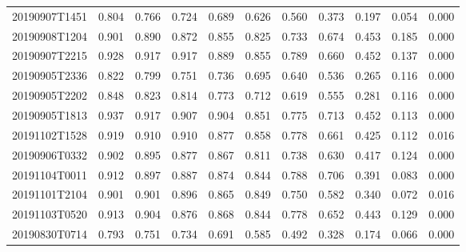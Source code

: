 \begin{table}[!ht]
{\begin{tabular}{ccccccccccc}
			20190907T1451 &          0.804 &          0.766 &          0.724 &          0.689 &          0.626 &          0.560 &          0.373 &          0.197 &          0.054 &          0.000 \\
			20190908T1204 &          0.901 &          0.890 &          0.872 &          0.855 &          0.825 &          0.733 &          0.674 &          0.453 &          0.185 &          0.000 \\
			20190907T2215 &          0.928 &          0.917 &          0.917 &          0.889 &          0.855 &          0.789 &          0.660 &          0.452 &          0.137 &          0.000 \\
			20190905T2336 &          0.822 &          0.799 &          0.751 &          0.736 &          0.695 &          0.640 &          0.536 &          0.265 &          0.116 &          0.000 \\
			20190905T2202 &          0.848 &          0.823 &          0.814 &          0.773 &          0.712 &          0.619 &          0.555 &          0.281 &          0.116 &          0.000 \\
			20190905T1813 &          0.937 &          0.917 &          0.907 &          0.904 &          0.851 &          0.775 &          0.713 &          0.452 &          0.113 &          0.000 \\
			20191102T1528 &          0.919 &          0.910 &          0.910 &          0.877 &          0.858 &          0.778 &          0.661 &          0.425 &          0.112 &          0.016 \\
			20190906T0332 &          0.902 &          0.895 &          0.877 &          0.867 &          0.811 &          0.738 &          0.630 &          0.417 &          0.124 &          0.000 \\
			20191104T0011 &          0.912 &          0.897 &          0.887 &          0.874 &          0.844 &          0.788 &          0.706 &          0.391 &          0.083 &          0.000 \\
			20191101T2104 &          0.901 &          0.901 &          0.896 &          0.865 &          0.849 &          0.750 &          0.582 &          0.340 &          0.072 &          0.016 \\
			20191103T0520 &          0.913 &          0.904 &          0.876 &          0.868 &          0.844 &          0.778 &          0.652 &          0.443 &          0.129 &          0.000 \\
			20190830T0714 &          0.793 &          0.751 &          0.734 &          0.691 &          0.585 &          0.492 &          0.328 &          0.174 &          0.066 &          0.000 \\

\end{tabular}}
\end{table}
